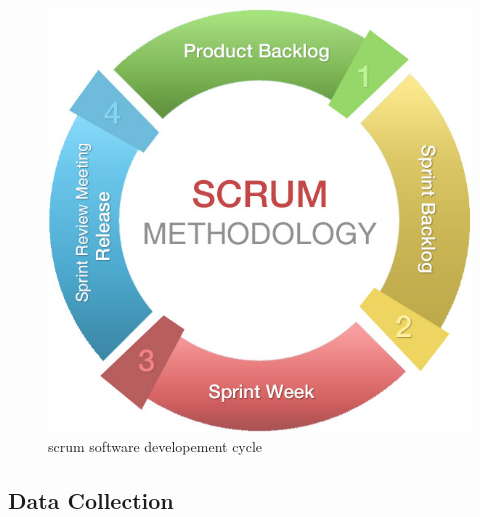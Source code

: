 \begin{figure}[!h]
\centering
\includegraphics[width = 5 cm]{fig/scrum-chart.jpg}
\caption{scrum software developement cycle}
\label{fig:scrum}
\end{figure}

\subsection{Data Collection}




